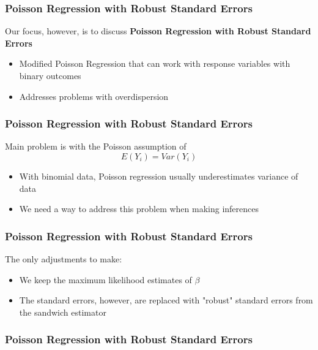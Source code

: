 \documentclass{beamer}
\begin{document}
\begin{frame}[fragile]\frametitle{Poisson Regression with Robust Standard Errors}
	
	Our focus, however, is to discuss \textbf{Poisson Regression with Robust Standard Errors}

	\begin{itemize}
	
		\item Modified Poisson Regression that can work with response variables with binary outcomes
		
		\item Addresses problems with overdispersion

	\end{itemize}
	
\end{frame}



\begin{frame}[fragile]\frametitle{Poisson Regression with Robust Standard Errors}

	Main problem is with the Poisson assumption of 	
	$$ E(Y_i) = Var(Y_i) $$ 

	\begin{itemize}

		\item With binomial data, Poisson regression usually underestimates variance of data
		
		\item We need a way to address this problem when making inferences

	\end{itemize}
	
\end{frame}



\begin{frame}[fragile]\frametitle{Poisson Regression with Robust Standard Errors}
	
	The only adjustments to make:	
	
	\begin{itemize}
	
		\item We keep the maximum likelihood estimates of $ \beta $
		
		\item The standard errors, however, are replaced with "robust" standard errors from the sandwich estimator

	\end{itemize}
	
\end{frame}



\begin{frame}[fragile]\frametitle{Poisson Regression with Robust Standard Errors}
	
	
\end{frame}
\end{document}
